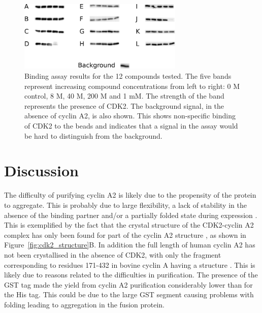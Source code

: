 \begin{figure}
\centering

\includegraphics[width=0.7\textwidth]{figures/binding_assay/binding_assay}

\caption[Results of binding assay with selected compounds]
{Binding assay results for the 12 compounds tested.
The five bands represent increasing compound concentrations from left to right: 0 M control, 8 \textmu M, 40 \textmu M, 200 \textmu M and 1 mM.
The strength of the band represents the presence of CDK2.
The background signal, in the absence of cyclin A2, is also shown.
This shows non-specific binding of CDK2 to the beads and indicates that a signal in the assay would be hard to distinguish from the background.}

\label{fig:binding_assay}
\end{figure}


\section{Discussion}
\label{sec:cdk2_discussion}

The difficulty of purifying cyclin A2 is likely due to the propensity of the protein to aggregate.
This is probably due to large flexibility, a lack of stability in the absence of the binding partner and/or a partially folded state during expression \cite{Grigoroudis2015}.
This is exemplified by the fact that the crystal structure of the CDK2-cyclin A2 complex has only been found for part of the cyclin A2 structure \cite{Jeffrey1995}, as shown in Figure~\ref{fig:cdk2_structure}B.
In addition the full length of human cyclin A2 has not been crystallised in the absence of CDK2, with only the fragment corresponding to residues 171-432 in bovine cyclin A having a structure \cite{Brown1995}.
This is likely due to reasons related to the difficulties in purification.
The presence of the GST tag made the yield from cyclin A2 purification considerably lower than for the His tag.
This could be due to the large GST segment causing problems with folding leading to aggregation in the fusion protein.

